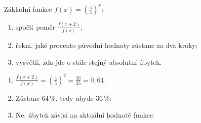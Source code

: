 \documentclass[11pt,a4paper]{article}
\begin{document}
\begin{prikladReseniBox}[title={Příklad 4}]
Základní funkce $f(x)=\left(\frac{4}{5}\right)^x$:
\begin{enumerate}[label=\alph*)]
\item spočti poměr $\frac{f(x+2)}{f(x)}$;
\item řekni, jaké procento původní hodnoty zůstane za dva kroky;
\item vysvětli, zda jde o stále stejný absolutní úbytek.
\end{enumerate}
\tcblower
\begin{enumerate}[label=\alph*)]
\item $\frac{f(x+2)}{f(x)}=\left(\frac{4}{5}\right)^2=\frac{16}{25}=0{,}64$.
\item Zůstane $64\,\%$, tedy ubyde $36\,\%$.
\item Ne; úbytek závisí na aktuální hodnotě funkce.
\end{enumerate}
\end{prikladReseniBox}
\end{document}
